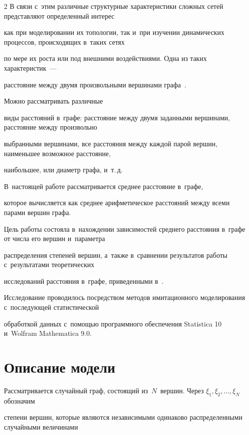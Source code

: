 \begin{multicols}{2}
В связи с~этим различные структурные характеристики слож\-ных сетей пред\-став\-ля\-ют определенный интерес

как при моделировании их топологии, так и~при изучении динамических процессов, происходящих в~таких сетях

по мере их рос\-та или под внешними воздействиями. Одна из таких характеристик~---

рас\-сто\-яние между двумя произвольными вершинами графа~\cite{Dur, Hof2, New1}.



 Мож\-но рас\-смат\-ри\-вать различные

виды расстояний в~графе: расстояние между двумя заданными вершинами, рас\-сто\-яние между произвольно\linebreak

выбранными вершинами, все расстояния между каж\-дой парой вершин, наименьшее воз\-мож\-ное {рас\-сто\-яние},

наибольшее, или диаметр графа, и~т.\,д. 



В~на\-сто\-ящей работе рассматривается среднее расстояние в~графе,

которое вы\-чис\-ля\-ет\-ся как среднее арифметическое расстояний между всеми парами вершин графа.

Цель работы со\-сто\-яла в~на\-хож\-де\-нии зависимостей среднего расстояния в~графе от числа его вершин и~па\-ра\-мет\-ра 

распределения степеней вершин, а~также в~сравнении результатов работы с~результатами тео\-ре\-ти\-че\-ских

исследований рас\-сто\-яния в~графе, приведенными в~\cite{Hof2}.

Исследование проводилось по\-средст\-вом методов имитационного моделирования с~по\-сле\-ду\-ющей статистической

обработкой данных с~помощью программного обеспечения Statistica 10 и~Wolfram Mathematica 9.0.



\section{Описание модели}



Рассматривается случайный граф, со\-сто\-ящий из~$N$~вершин. Через $\xi_1,\xi_2,\ldots,\xi_N$ обозначим

степени вершин, которые являются независимыми одинаково распределенными случайными величинами


\end{multicols}
